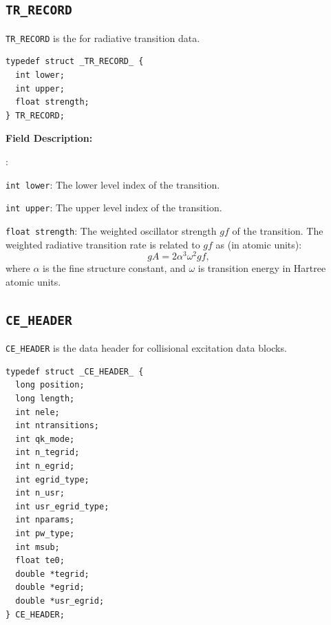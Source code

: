 \documentclass[twoside,letterpaper]{refrep}
\newenvironment{dbdesc}{\textbf{Field Description:} \begin{list}
	{:}{\setlength{\labelwidth}{2in}
	   \setlength{\leftmargin}{2in}
	   \setlength{\labelsep}{0.1in}
	   \setlength{\rightmargin}{0.2in}}}
	{\end{list}}
\begin{document}
\subsection{\texttt{TR\_RECORD}}
\texttt{TR\_RECORD} is the for radiative transition data.

\begin{verbatim}
typedef struct _TR_RECORD_ {
  int lower;
  int upper;
  float strength;
} TR_RECORD;
\end{verbatim}

\begin{dbdesc}
\item[\texttt{int lower}:] The lower level index of the transition.
\item[\texttt{int upper}:] The upper level index of the transition.
\item[\texttt{float strength}:] The weighted oscillator strength $gf$ of the
transition. The weighted radiative transition rate is related to $gf$ as (in
atomic units):
\begin{equation}
gA = 2\alpha^3 \omega^2 gf,
\end{equation}
where $\alpha$ is the fine structure constant, and $\omega$ is transition
energy in Hartree atomic units. 

\end{dbdesc}

\subsection{\texttt{CE\_HEADER}}
\texttt{CE\_HEADER} is the data header for collisional excitation data blocks.

\begin{verbatim}
typedef struct _CE_HEADER_ {
  long position;
  long length;
  int nele;
  int ntransitions;
  int qk_mode;
  int n_tegrid;
  int n_egrid;
  int egrid_type;
  int n_usr;
  int usr_egrid_type;
  int nparams;
  int pw_type;
  int msub;
  float te0;
  double *tegrid;
  double *egrid;
  double *usr_egrid;
} CE_HEADER;
\end{verbatim}
\end{document}
